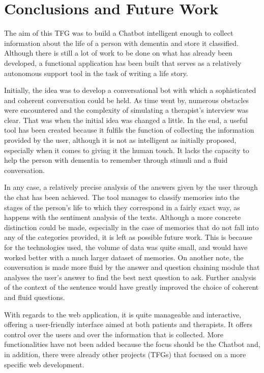 \chapter{Conclusions and Future Work}
\label{cap:conclusions}

The aim of this TFG was to build a Chatbot intelligent enough to collect information about the life of a person with dementia and store it classified. Although there is still a lot of work to be done on what has already been developed, a functional application has been built that serves as a relatively autonomous support tool in the task of writing a life story.

Initially, the idea was to develop a conversational bot with which a sophisticated and coherent conversation could be held. As time went by, numerous obstacles were encountered and the complexity of simulating a therapist's interview was clear. That was when the initial idea was changed a little. In the end, a useful tool has been created because it fulfils the function of collecting the information provided by the user, although it is not as intelligent as initially proposed, especially when it comes to giving it the human touch. It lacks the capacity to help the person with dementia to remember through stimuli and a fluid conversation.

In any case, a relatively precise analysis of the answers given by the user through the chat has been achieved. The tool manages to classify memories into the stages of the person's life to which they correspond in a fairly exact way, as happens with the sentiment analysis of the texts. Although a more concrete distinction could be made, especially in the case of memories that do not fall into any of the categories provided, it is left as possible future work. This is because for the technologies used, the volume of data was quite small, and would have worked better with a much larger dataset of memories. On another note, the conversation is made more fluid by the answer and question chaining module that analyses the user's answer to find the best next question to ask. Further analysis of the context of the sentence would have greatly improved the choice of coherent and fluid questions.

With regards to the web application, it is quite manageable and interactive, offering a user-friendly interface aimed at both patients and therapists. It offers control over the users and over the information that is collected. More functionalities have not been added because the focus should be the Chatbot and, in addition, there were already other projects (TFGs) that focused on a more specific web development.

